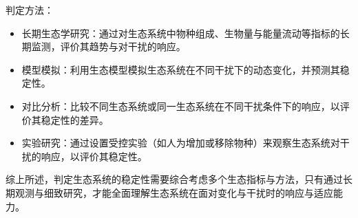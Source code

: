 \documentclass[11pt,a4paper]{ctexart}
\begin{document}
判定方法：

\begin{itemize}
\item 长期生态学研究：通过对生态系统中物种组成、生物量与能量流动等指标的长期监测，评价其趋势与对干扰的响应。
\item 模型模拟：利用生态模型模拟生态系统在不同干扰下的动态变化，并预测其稳定性。
\item 对比分析：比较不同生态系统或同一生态系统在不同干扰条件下的响应，以评价其稳定性的差异。
\item 实验研究：通过设置受控实验（如人为增加或移除物种）来观察生态系统对干扰的响应，以评价其稳定性。
\end{itemize}

综上所述，判定生态系统的稳定性需要综合考虑多个生态指标与方法，只有通过长期观测与细致研究，才能全面理解生态系统在面对变化与干扰时的响应与适应能力。
\end{document}

